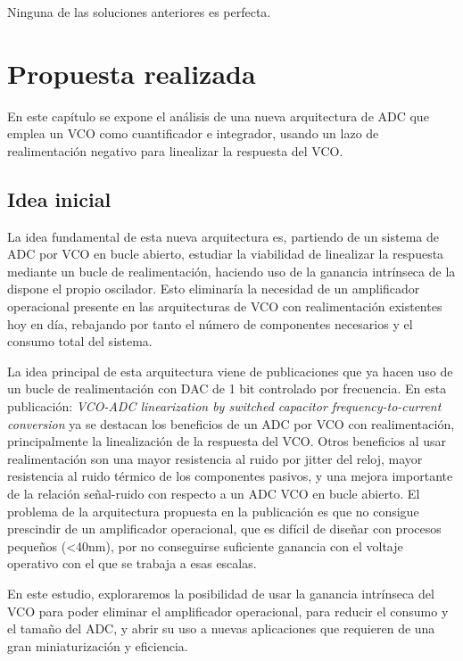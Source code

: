 \documentclass[12pt]{report} %
\begin{document}
	Ninguna de las soluciones anteriores es perfecta.
	
\chapter{Propuesta realizada}
	
	En este capítulo se expone el análisis de una nueva arquitectura de ADC que emplea un VCO como cuantificador e integrador, usando un lazo de realimentación negativo para linealizar la respuesta del VCO.
	
	\section{Idea inicial}\label{sc:initial-idea}
	
	La idea fundamental de esta nueva arquitectura es, partiendo de un sistema de ADC por VCO en bucle abierto, estudiar la viabilidad de linealizar la respuesta mediante un bucle de realimentación, haciendo uso de la ganancia intrínseca de la dispone el propio oscilador. Esto eliminaría la necesidad de un amplificador operacional presente en las arquitecturas de VCO con realimentación existentes hoy en día, rebajando por tanto el número de componentes necesarios y el consumo total del sistema.
	
	La idea principal de esta arquitectura viene de publicaciones que ya hacen uso de un bucle de realimentación con DAC de 1 bit controlado por frecuencia. En esta publicación: \textit{VCO-ADC linearization by switched capacitor frequency-to-current conversion}\cite{vco-adc-ruben-eric} ya se destacan los beneficios de un ADC por VCO con realimentación, principalmente la linealización de la respuesta del VCO. Otros beneficios al usar realimentación son una mayor resistencia al ruido por jitter del reloj, mayor resistencia al ruido térmico de los componentes pasivos, y una mejora importante de la relación señal-ruido con respecto a un ADC VCO en bucle abierto. El problema de la arquitectura propuesta en la publicación es que no consigue prescindir de un amplificador operacional, que es difícil de diseñar con procesos pequeños (<40nm), por no conseguirse suficiente ganancia con el voltaje operativo con el que se trabaja a esas escalas.
	
	En este estudio, exploraremos la posibilidad de usar la ganancia intrínseca del VCO para poder eliminar el amplificador operacional, para reducir el consumo y el tamaño del ADC, y abrir su uso a nuevas aplicaciones que requieren de una gran miniaturización y eficiencia.
	
\end{document}
